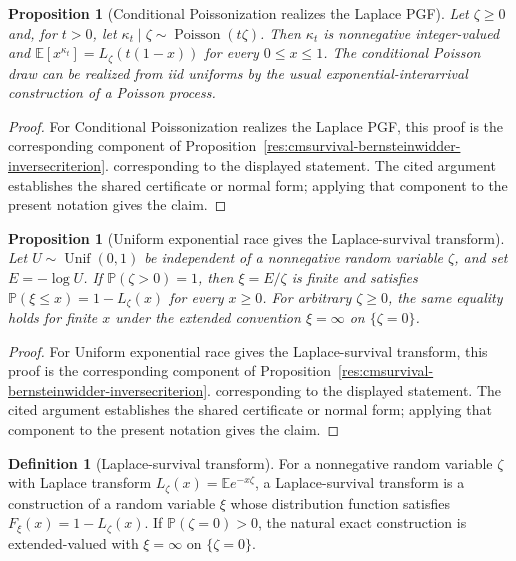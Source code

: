 \documentclass[11pt]{article}
\numberwithin{equation}{section}
\newtheorem{proposition}[theorem]{Proposition}
\theoremstyle{definition}
\newtheorem{definition}{Definition}[section]
\theoremstyle{remark}
\newcommand{\1}{\mathbf 1}
\begin{document}
\begin{proposition}[Conditional Poissonization realizes the Laplace PGF]
\label{res:conditionalpoissonization-pgf}
Let \(\zeta\ge0\) and, for \(t>0\), let \(\kappa_t\mid\zeta\sim\operatorname{Poisson}(t\zeta)\). Then \(\kappa_t\) is nonnegative integer-valued and \(\mathbb E[x^{\kappa_t}]=L_\zeta(t(1-x))\) for every \(0\le x\le1\). The conditional Poisson draw can be realized from iid uniforms by the usual exponential-interarrival construction of a Poisson process.
\end{proposition}

\begin{proof}
For Conditional Poissonization realizes the Laplace PGF, this proof is the corresponding component of Proposition~\ref{res:cmsurvival-bernsteinwidder-inversecriterion}.  corresponding to the displayed statement.  The cited argument establishes the shared certificate or normal form; applying that component to the present notation gives the claim.
\end{proof}

\begin{proposition}[Uniform exponential race gives the Laplace-survival transform]
\label{res:uniformexponentialrace-laplacesurvival}
Let \(U\sim\operatorname{Unif}(0,1)\) be independent of a nonnegative random variable \(\zeta\), and set \(E=-\log U\). If \(\mathbb P(\zeta>0)=1\), then \(\xi=E/\zeta\) is finite and satisfies \(\mathbb P(\xi\le x)=1-L_\zeta(x)\) for every \(x\ge0\). For arbitrary \(\zeta\ge0\), the same equality holds for finite \(x\) under the extended convention \(\xi=\infty\) on \(\{\zeta=0\}\).
\end{proposition}

\begin{proof}
For Uniform exponential race gives the Laplace-survival transform, this proof is the corresponding component of Proposition~\ref{res:cmsurvival-bernsteinwidder-inversecriterion}.  corresponding to the displayed statement.  The cited argument establishes the shared certificate or normal form; applying that component to the present notation gives the claim.
\end{proof}

\begin{definition}[Laplace-survival transform]
\label{res:laplacesurvivaltransform}
For a nonnegative random variable \(\zeta\) with Laplace transform \(L_\zeta(x)=\mathbb E e^{-x\zeta}\), a Laplace-survival transform is a construction of a random variable \(\xi\) whose distribution function satisfies \(F_\xi(x)=1-L_\zeta(x)\). If \(\mathbb P(\zeta=0)>0\), the natural exact construction is extended-valued with \(\xi=\infty\) on \(\{\zeta=0\}\).
\end{definition}
\end{document}
